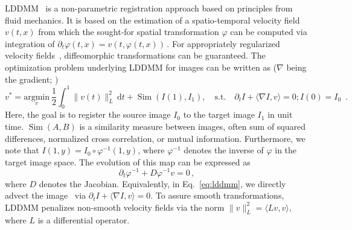 \documentclass{article}
\numberwithin{equation}{section}
\let\on=\operatorname
\newcommand{\ud}{\,\mathrm{d}}
\newcommand{\zy}[1]{{\color{black}{#1}}}
\begin{document}
LDDMM~\citep{beg2005computing} is a non-parametric registration approach based on principles from fluid mechanics. It is based on the estimation of a spatio-temporal velocity field $v(t,x)$ from which the sought-for spatial transformation $\varphi$ can be computed via integration of $\partial_t \varphi (t,x) = v(t,\varphi (t,x))\,.$  For appropriately regularized velocity fields~\citep{dupuis1998variational}, diffeomorphic transformations can be guaranteed. The optimization problem underlying LDDMM for images can be written as ($\nabla$ being the gradient; \zy{$\langle \cdot,\cdot\rangle$ indicating the inner product})
\begin{equation}
v^* = \underset{v}{\text{argmin}}~ \frac 12 \int_0^1 \|v(t) \|^2_L \ud t + \on{Sim}(I(1),I_1), \quad\text{s.t.}\quad
\partial_t I + \langle \nabla I, v\rangle=0; I(0)=I_0\enspace.
\label{eq:lddmm}
\end{equation}
Here, the goal is to register the source image $I_0$ to the target image $I_1$ in unit time. $\on{Sim}(A,B)$ is a similarity measure between images, often sum of squared differences, normalized cross correlation, or mutual information. Furthermore, we note that $I(1,y)=I_0\circ\varphi^{-1}(1,y)$, where $\varphi^{-1}$ denotes the inverse of $\varphi$ in the target image space. The evolution of this map can be expressed as \begin{equation}\label{EqFlowEquation}\partial_t \varphi^{-1} + D\varphi^{-1}v=0\,,
\end{equation} 
where $D$ denotes the Jacobian. Equivalently, in Eq.~\eqref{eq:lddmm}, we directly advect the image~\citep{hart2009optimal,vialard2012diffeomorphic} via $\partial_t I + \langle \nabla I, v\rangle=0$. To assure smooth transformations, LDDMM penalizes non-smooth velocity fields via the norm $\|v\|_L^2=\langle Lv,v\rangle$, where $L$ is a differential operator.
\end{document}
